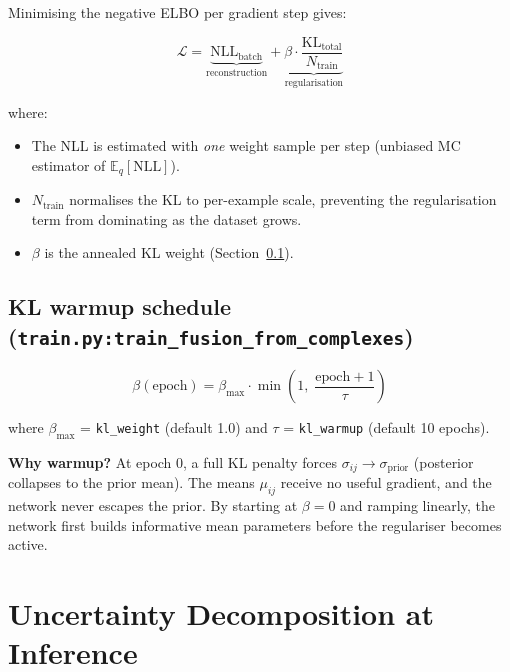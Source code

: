\documentclass[11pt,a4paper]{article}
\newcommand{\code}[1]{\texttt{#1}}
\begin{document}
Minimising the negative ELBO per gradient step gives:

\begin{equation}
\boxed{
\mathcal{L}
= \underbrace{\mathrm{NLL}_{\mathrm{batch}}}_{\text{reconstruction}}
+ \underbrace{\beta \cdot \frac{\mathrm{KL}_{\mathrm{total}}}{N_{\mathrm{train}}}}_{\text{regularisation}}
}
\label{eq:elbo}
\end{equation}

where:
\begin{itemize}
  \item The NLL is estimated with \emph{one} weight sample per step (unbiased MC
        estimator of $\mathbb{E}_q[\mathrm{NLL}]$).
  \item $N_{\mathrm{train}}$ normalises the KL to per-example scale, preventing the
        regularisation term from dominating as the dataset grows.
  \item $\beta$ is the annealed KL weight (Section~\ref{sec:warmup}).
\end{itemize}

\subsection{KL warmup schedule (\code{train.py:train\_fusion\_from\_complexes})}
\label{sec:warmup}

\begin{equation}
\beta(\text{epoch}) = \beta_{\max} \cdot \min\!\left(1,\;
  \frac{\text{epoch}+1}{\tau}\right)
\label{eq:warmup}
\end{equation}

where $\beta_{\max}$ = \texttt{kl\_weight} (default 1.0) and $\tau$ =
\texttt{kl\_warmup} (default 10 epochs).

\medskip
\textbf{Why warmup?}  At epoch 0, a full KL penalty forces
$\sigma_{ij} \to \sigma_{\mathrm{prior}}$ (posterior collapses to the prior mean).
The means $\mu_{ij}$ receive no useful gradient, and the network never escapes the
prior.  By starting at $\beta = 0$ and ramping linearly, the network first
builds informative mean parameters before the regulariser becomes active.

\section{Uncertainty Decomposition at Inference}
\label{sec:uncertainty}
\end{document}
